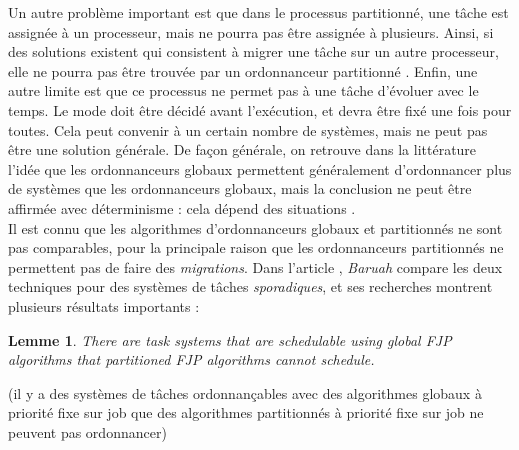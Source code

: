 \documentclass[11pt,a4paper,oneside]{report}
\newtheorem{mylemme}{Lemme}
\begin{document}
Un autre problème important est que dans le processus partitionné, une tâche est 
assignée à un processeur, mais ne pourra pas être assignée à plusieurs. Ainsi, si des solutions 
existent qui consistent à migrer une tâche sur un autre processeur, elle ne pourra pas être trouvée 
par un ordonnanceur partitionné \cite{ramamurthy_static-priority_2000}. 
Enfin, une autre limite est que ce processus ne permet pas à une tâche d'évoluer avec le temps. 
Le mode doit être décidé avant l'exécution, et devra être fixé une fois pour toutes. 
Cela peut convenir à un certain nombre de systèmes, mais ne peut pas être une solution générale.
De façon générale, on retrouve dans la littérature l'idée que les ordonnanceurs globaux 
permettent généralement d'ordonnancer plus de systèmes que les ordonnanceurs globaux, 
mais la conclusion ne peut être affirmée avec déterminisme : cela dépend des situations
\cite{lopez_utilization_2004}.\\


Il est connu que les algorithmes d'ordonnanceurs globaux et partitionnés ne sont pas comparables, 
pour la principale raison que les ordonnanceurs partitionnés ne permettent pas de faire des 
\textit{migrations}. Dans l'article \cite{baruah_techniques_2007}, \textit{Baruah} 
compare les deux techniques pour des systèmes de tâches \textit{sporadiques}, et 
ses recherches montrent plusieurs résultats importants :\\
\begin{mylemme}
	There are task systems that are schedulable using global FJP algorithms that partitioned FJP algorithms cannot schedule.
\end{mylemme}
(il y a des systèmes de tâches ordonnançables avec des algorithmes globaux à priorité fixe 
sur job que des algorithmes partitionnés à priorité fixe sur job ne peuvent pas ordonnancer)\\
\end{document}
